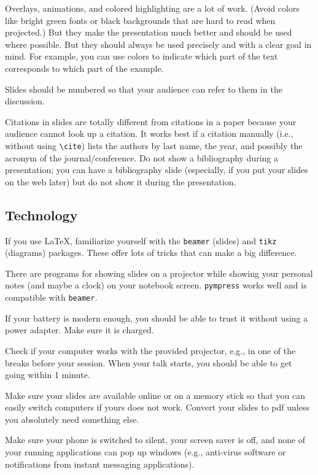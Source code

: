 \documentclass[12pt]{article}
\begin{document}
Overlays, animations, and colored highlighting are a lot of work.
(Avoid colors like bright green fonts or black backgrounds that are hard to read when projected.)
But they make the presentation much better and should be used where possible.
But they should always be used precisely and with a clear goal in mind.
For example, you can use colors to indicate which part of the text corresponds to which part of the example. 
\medskip

Slides should be numbered so that your audience can refer to them in the discussion.
\medskip

Citations in slides are totally different from citations in a paper because your audience cannot look up a citation.
It works best if a citation manually (i.e., without using \verb|\cite|) lists the authors by last name, the year, and possibly the acronym of the journal/conference.
Do not show a bibliography during a presentation; you can have a bibliography slide (especially, if you put your slides on the web later) but do not show it during the presentation.

\subsection{Technology}

If you use LaTeX, familiarize yourself with the \texttt{beamer} (slides) and \texttt{tikz} (diagrams) packages.
These offer lots of tricks that can make a big difference.
\medskip

There are programs for showing slides on a projector while showing your personal notes (and maybe a clock) on your notebook screen.
\texttt{pympress} works well and is compatible with \texttt{beamer}. 
\medskip

If your battery is modern enough, you should be able to trust it without using a power adapter.
Make sure it is charged.
\medskip

Check if your computer works with the provided projector, e.g., in one of the breaks before your session.
When your talk starts, you should be able to get going within 1 minute.
\medskip

Make sure your slides are available online or on a memory stick so that you can easily switch computers if yours does not work.
Convert your slides to pdf unless you absolutely need something else.
\medskip

Make sure your phone is switched to silent, your screen saver is off, and none of your running applications can pop up windows (e.g., anti-virus software or notifications from instant messaging applications).
\medskip
\end{document}
